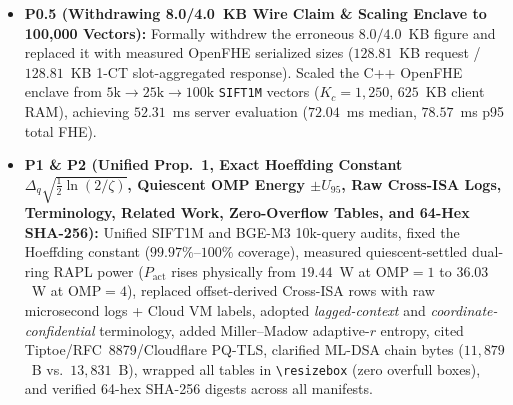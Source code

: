 \documentclass[11pt]{article}
\begin{document}
\begin{itemize}
    \item \textbf{P0.5 (Withdrawing 8.0/4.0~KB Wire Claim \& Scaling Enclave to 100,000 Vectors):} Formally withdrew the erroneous $8.0/4.0$~KB figure and replaced it with measured OpenFHE serialized sizes ($128.81$~KB request / $128.81$~KB 1-CT slot-aggregated response). Scaled the C++ OpenFHE enclave from $5\text{k} \to 25\text{k} \to 100\text{k}$ \texttt{SIFT1M} vectors ($K_c=1,250$, $625$~KB client RAM), achieving $52.31$~ms server evaluation ($72.04$~ms median, $78.57$~ms p95 total FHE).
    \item \textbf{P1 \& P2 (Unified Prop.~1, Exact Hoeffding Constant $\Delta_q\sqrt{\tfrac{1}{2}\ln(2/\zeta)}$, Quiescent OMP Energy $\pm U_{95}$, Raw Cross-ISA Logs, Terminology, Related Work, Zero-Overflow Tables, and 64-Hex SHA-256):} Unified SIFT1M and BGE-M3 10k-query audits, fixed the Hoeffding constant ($99.97\%\text{--}100\%$ coverage), measured quiescent-settled dual-ring RAPL power ($P_{\text{act}}$ rises physically from $19.44$~W at $\text{OMP}=1$ to $36.03$~W at $\text{OMP}=4$), replaced offset-derived Cross-ISA rows with raw microsecond logs + Cloud VM labels, adopted \emph{lagged-context} and \emph{coordinate-confidential} terminology, added Miller--Madow adaptive-$r$ entropy, cited Tiptoe/RFC~8879/Cloudflare PQ-TLS, clarified ML-DSA chain bytes ($11,879$~B vs.\ $13,831$~B), wrapped all tables in \texttt{\textbackslash resizebox} (zero overfull boxes), and verified 64-hex SHA-256 digests across all manifests.
\end{itemize}
\end{document}
